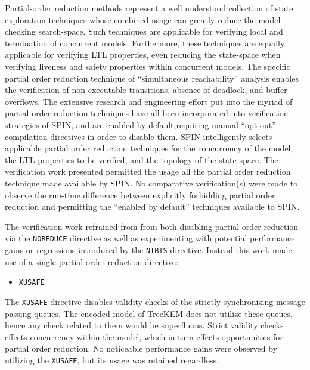 Partial-order reduction methods represent a well understood collection of state exploration techniques \autocite{godefroid1990using, godefroid1991using, godefroid1994partial} whose combined usage can greatly reduce the model checking search-space.
Such techniques are applicable for verifying local and termination of concurrent models.
Furthermore, these techniques are equally applicable for verifying LTL properties, even reducing the state-space when verifying liveness and safety properties within concurrent models.
The specific partial order reduction technique of ``simultaneous reachability'' analysis \autocite{van1997partial} enables the verification of non-executable transitions, absence of deadlock, and buffer overflows.
The extensive research and engineering effort put into the myriad of partial order reduction techniques have all been incorporated into verification strategies of SPIN, and are enabled by default,requiring manual ``opt-out'' compilation directives in order to disable them.
SPIN intelligently selects applicable partial order reduction techniques for the concurrency of the model, the LTL properties to be verified, and the topology of the state-space.
The verification work presented permitted the usage all the partial order reduction technique made available by SPIN.\@
No comparative verification(s) were made to observe the run-time difference between explicitly forbidding partial order reduction and permitting the ``enabled by default'' techniques available to SPIN.\@

The verification work refrained from from both disabling partial order reduction via the \texttt{NOREDUCE} directive as well as experimenting with potential performance gains or regressions introduced by the \texttt{NIBIS} directive.
Instead this work made use of a single partial order reduction directive:

\begin{itemize}
\item \texttt{XUSAFE}
\end{itemize}

The \texttt{XUSAFE} directive disables validity checks of the strictly synchronizing message passing queues.
The encoded model of TreeKEM does not utilize these queues, hence any check related to them would be superfluous.
Strict validity checks effects concurrency within the model, which in turn effects opportunities for partial order reduction.
No noticeable performance gains were observed by utilizing the \texttt{XUSAFE}, but its usage was retained regardless.


